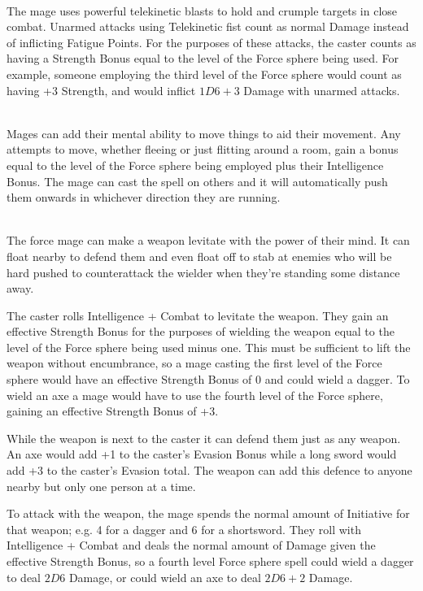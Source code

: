 \begin{multicols}{2}
\\
The mage uses powerful telekinetic blasts to hold and crumple targets in close combat.
Unarmed attacks using Telekinetic fist count as normal Damage instead of inflicting Fatigue Points.
For the purposes of these attacks, the caster counts as having a Strength Bonus equal to the level of the Force sphere being used.
For example, someone employing the third level of the Force sphere would count as having +3 Strength, and would inflict $1D6+3$ Damage with unarmed attacks.

\\
Mages can add their mental ability to move things to aid their movement.
Any attempts to move, whether fleeing or just flitting around a room, gain a bonus equal to the level of the Force sphere being employed plus their Intelligence Bonus.
The mage can cast the spell on others and it will automatically push them onwards in whichever direction they are running.

\spelllevel

\\
The force mage can make a weapon levitate with the power of their mind. It can float nearby to defend them and even float off to stab at enemies who will be hard pushed to counterattack the wielder when they're standing some distance away.

The caster rolls Intelligence + Combat to levitate the weapon.
They gain an effective Strength Bonus for the purposes of wielding the weapon equal to the level of the Force sphere being used minus one.
This must be sufficient to lift the weapon without encumbrance, so a mage casting the first level of the Force sphere would have an effective Strength Bonus of 0 and could wield a dagger.
To wield an axe a mage would have to use the fourth level of the Force sphere, gaining an effective Strength Bonus of +3.

While the weapon is next to the caster it can defend them just as any weapon. An axe would add +1 to the caster's Evasion Bonus while a long sword would add +3 to the caster's Evasion total. The weapon can add this defence to anyone nearby but only one person at a time.

To attack with the weapon, the mage spends the normal amount of Initiative for that weapon; e.g. 4 for a dagger and 6 for a shortsword.
They roll with Intelligence + Combat and deals the normal amount of Damage given the effective Strength Bonus, so a fourth level Force sphere spell could wield a dagger to deal $2D6$ Damage, or could wield an axe to deal $2D6+2$ Damage.


\end{multicols}
